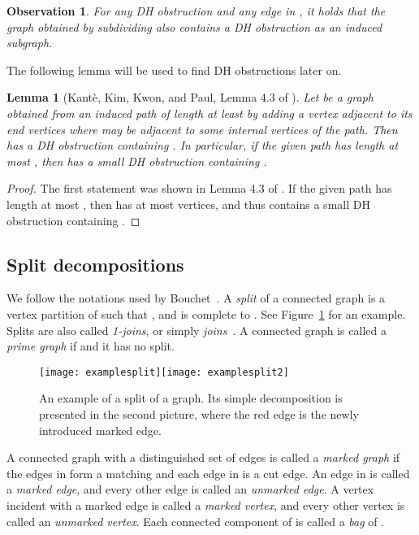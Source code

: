 \documentclass[11pt]{elsarticle}
\newtheorem{lemma}[theorem]{Lemma}
\newtheorem{observation}[theorem]{Observation}
\begin{document}
\begin{observation}
\label{obs:sub}
For any DH obstruction  and any edge  in , it holds that the graph  obtained by subdividing  also contains a DH obstruction as an induced subgraph.
\end{observation}
The following lemma will be used to find DH obstructions later on.

\begin{lemma}[Kant\`e, Kim, Kwon, and Paul, Lemma 4.3 of \cite{KanteKKP2015}]\label{lem:dhobs}
Let  be a graph obtained from an induced path of length at least  by adding a vertex  adjacent to its end vertices where
 may be adjacent to some internal vertices of the path.
Then  has a DH obstruction containing .
In particular, if the given path has length at most , then  has a small DH obstruction containing .
\end{lemma}
\begin{proof}
The first statement was shown in Lemma 4.3 of \cite{KanteKKP2015}. If the given path has length at most , then  has at most  vertices, and thus  contains a small DH obstruction containing .
\end{proof}

\subsection{Split decompositions}

We follow the notations used by Bouchet~\cite{Bouchet1988a}.
A \emph{split} of a connected graph  is a vertex partition  of  such that , and  is complete to . 
See Figure~\ref{fig:examplesplit} for an example.
Splits are also called \emph{1-joins}, or simply \emph{joins}~\cite{GSH1989}. 
A connected graph  is called a \emph{prime graph} if  and it has no split.



\begin{figure}[t]
\centerline{\texttt{[image: examplesplit]}\qquad\qquad  \texttt{[image: examplesplit2]}}
\caption{An example of a split  of a graph. Its simple decomposition is presented in the second picture, where the red edge is the newly introduced marked edge.}
\label{fig:examplesplit}
\end{figure}


A connected graph  with a distinguished set of edges  is called a \emph{marked graph} if
the edges in  form a matching and each edge in  is a cut edge.
An edge in  is called a \emph{marked edge}, and every other edge is called an \emph{unmarked edge}.
A vertex incident with a marked edge is called a \emph{marked vertex},
and every other vertex is called an \emph{unmarked vertex}.
Each connected component of  is called a \emph{bag} of .
\end{document}
